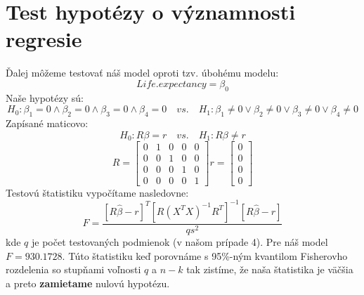 \section*{Test hypotézy o významnosti regresie}
Ďalej môžeme testovať náš model oproti tzv. úbohému modelu:
\[
    Life.expectancy = \beta_0
\]
Naše hypotézy sú:
\[
H_0: \beta_1=0\land\beta_2=0\land\beta_3=0\land\beta_4=0 \quad vs. \quad H_1: \beta_1\ne0\lor\beta_2\ne0\lor\beta_3\ne0\lor\beta_4\ne0
\]
Zapísané maticovo:
\[
    H_0: R\beta = r \quad vs. \quad H_1: R\beta \ne r
\]
\[
    R = \begin{bmatrix}
        0 & 1 & 0 & 0 & 0\\
        0 & 0 & 1 & 0 & 0\\
        0 & 0 & 0 & 1 & 0\\
        0 & 0 & 0 & 0 & 1
        \end{bmatrix}
    r = \begin{bmatrix}
        0 \\
        0 \\
        0 \\
        0 
        \end{bmatrix}
\]
Testovú štatistiku vypočítame nasledovne:
\[
    F = \frac{[R\hat{\beta}-r]^T[R(X^TX)^{-1}R^T]^{-1}[R\hat{\beta}-r]}{qs^2}
\]
kde $q$ je počet testovaných podmienok (v našom prípade 4). Pre náš model $F=930.1728$.
Túto štatistiku keď porovnáme s 95\%-ným kvantilom Fisherovho rozdelenia so stupňami voľnosti $q$ a $n-k$ tak zistíme,
že naša štatistika je väčšia a preto \textbf{zamietame} nulovú hypotézu.


